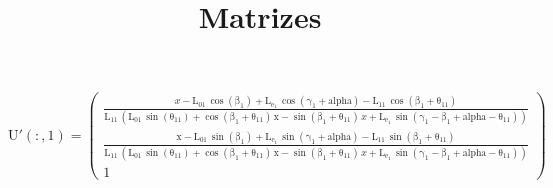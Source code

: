\documentclass[]{article}
\title{Matrizes}
\author{\studentname \qquad \uspid \qquad \uspmail}
\begin{document}
\maketitle
\thispagestyle{fancy}

\begin{equation*}
\mathrm{U'(:, 1)} = \left(\begin{array}{c} \frac{x - \mathrm{\mathrm{L_{01}}}\, \cos\!\left(\mathrm{\mathrm{\beta_1}}\right) + \mathrm{\mathrm{L_{e_1}}}\, \cos\!\left(\mathrm{\mathrm{\gamma_1}} + \mathrm{alpha}\right) - \mathrm{\mathrm{L_{11}}}\, \cos\!\left(\mathrm{\mathrm{\beta_1}} + \mathrm{\theta_{11}}\right)}{\mathrm{\mathrm{L_{11}}}\, \left(\mathrm{\mathrm{L_{01}}}\, \sin\!\left(\mathrm{\theta_{11}}\right) + \cos\!\left(\mathrm{\mathrm{\beta_1}} + \mathrm{\theta_{11}}\right)\, \mathrm{x} - \sin\!\left(\mathrm{\mathrm{\beta_1}} + \mathrm{\theta_{11}}\right)\, x + \mathrm{\mathrm{L_{e_1}}}\, \sin\!\left(\mathrm{\mathrm{\gamma_1}} - \mathrm{\mathrm{\beta_1}} + \mathrm{alpha} - \mathrm{\theta_{11}}\right)\right)}\\ \frac{\mathrm{x} - \mathrm{\mathrm{L_{01}}}\, \sin\!\left(\mathrm{\mathrm{\beta_1}}\right) + \mathrm{\mathrm{L_{e_1}}}\, \sin\!\left(\mathrm{\mathrm{\gamma_1}} + \mathrm{alpha}\right) - \mathrm{\mathrm{L_{11}}}\, \sin\!\left(\mathrm{\mathrm{\beta_1}} + \mathrm{\theta_{11}}\right)}{\mathrm{\mathrm{L_{11}}}\, \left(\mathrm{\mathrm{L_{01}}}\, \sin\!\left(\mathrm{\theta_{11}}\right) + \cos\!\left(\mathrm{\mathrm{\beta_1}} + \mathrm{\theta_{11}}\right)\, \mathrm{x} - \sin\!\left(\mathrm{\mathrm{\beta_1}} + \mathrm{\theta_{11}}\right)\, x + \mathrm{\mathrm{L_{e_1}}}\, \sin\!\left(\mathrm{\mathrm{\gamma_1}} - \mathrm{\mathrm{\beta_1}} + \mathrm{alpha} - \mathrm{\theta_{11}}\right)\right)}\\ 1 \end{array}\right)
\end{equation*}
\end{document}
